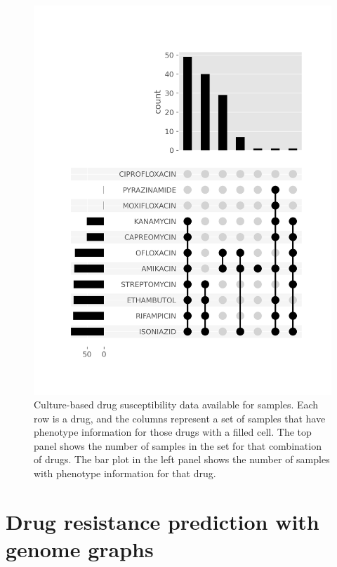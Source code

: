 \begin{figure}
\begin{center}
\includegraphics[width=0.90\columnwidth]{Chapter3/Figs/available_dst.png}
\caption{{Culture-based drug susceptibility data available for samples. Each row is a drug, and the columns represent a set of samples that have phenotype information for those drugs with a filled cell. The top panel shows the number of samples in the set for that combination of drugs. The bar plot in the left panel shows the number of samples with phenotype information for that drug.
{\label{fig:available-dst}}
}}
\end{center}
\end{figure}
\section{Drug resistance prediction with genome graphs}

